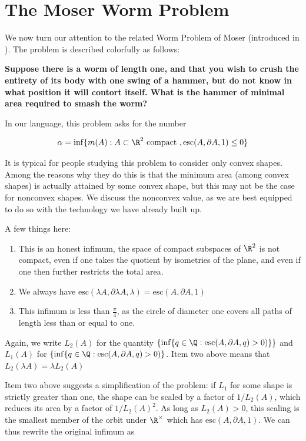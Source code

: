 \documentclass{journal}
\theoremstyle{definition}
\begin{document}
\section{The Moser Worm Problem}
\label{sec:moser}
We now turn our attention to the related Worm Problem of Moser (introduced in \cite{moser1966poorly}). The problem is described colorfully as follows:

\begin{center}
    \textbf{Suppose there is a worm of length one, and that you wish to crush the entirety of its body with one swing of a hammer, but do not know in what position it will contort itself. What is the hammer of minimal area required to smash the worm?}
\end{center}

In our language, this problem asks for the number

$$\alpha = \inf \{m(A): A\subset \R^2 \text{ compact } , \mathrm{esc}(A,\partial A, 1) \leq 0\} $$

It is typical for people studying this problem to consider only convex shapes. Among the reasons why they do this is that the minimum area (among convex shapes) is actually attained by some convex shape, but this may not be the case for nonconvex shapes. We discuss the nonconvex value, as we are best equipped to do so with the technology we have already built up.

A few things here:
\begin{enumerate}
    \item This is an honest infimum, the space of compact subspaces of $\R^2$ is not compact, even if one takes the quotient by isometries of the plane, and even if one then further restricts the total area.
    \item We always have $\mathrm{esc}(\lambda A, \partial \lambda A, \lambda) = \mathrm{esc}(A,\partial A, 1)$
    \item This infimum is less than $\frac{\pi}{4}$, as the circle of diameter one covers all paths of length less than or equal to one.
\end{enumerate}
Again, we write $L_2(A)$ for the quantity $\{\inf\{q\in\Q:\mathrm{esc}(A,\partial A, q) > 0)\}\}$ and $L_1(A)$ for $\{\inf\{q\in\Q:\mathrm{esc}(A,\partial A, q) > 0)\}$. Item two above means that $L_2(\lambda A) = \lambda L_2(A)$

Item two above suggests a simplification of the problem: if $L_1$ for some shape is strictly greater than one, the shape can be scaled by a factor of $1/L_2(A)$, which reduces its area by a factor of $1/L_2(A)^2$. As long as $L_2(A)>0$, this scaling is the smallest member of the orbit under $\R^\times$ which has $\mathrm{esc}(A,\partial A, 1)$. We can thus rewrite the original infimum as
\end{document}
